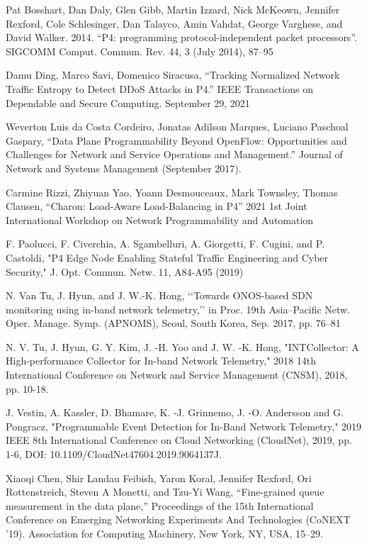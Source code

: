 \documentclass[conference]{IEEEtran}
\begin{document}
\begin{thebibliography}{00}
 Pat Bosshart, Dan Daly, Glen Gibb, Martin Izzard, Nick McKeown, Jennifer Rexford, Cole Schlesinger, Dan Talayco, Amin Vahdat, George Varghese, and David Walker. 2014. “P4: programming protocol-independent packet processors”. SIGCOMM Comput. Commun. Rev. 44, 3 (July 2014), 87–95

 Damu Ding, Marco Savi, Domenico Siracusa, “Tracking Normalized Network Traffic Entropy to Detect DDoS Attacks in P4.” IEEE Transactions on Dependable and Secure Computing. September 29, 2021

 Weverton Luis da Costa Cordeiro, Jonatas Adilson Marques, Luciano Paschoal Gaspary, “Data Plane Programmability Beyond OpenFlow: Opportunities and Challenges for Network and Service Operations and Management.” Journal of Network and Systems Management (September 2017).

 Carmine Rizzi, Zhiyuan Yao, Yoann Desmouceaux, Mark Townsley, Thomas Clausen, “Charon: Load-Aware Load-Balancing in P4” 2021 1st Joint International Workshop on Network Programmability and Automation

 F. Paolucci, F. Civerchia, A. Sgambelluri, A. Giorgetti, F. Cugini, and P. Castoldi, "P4 Edge Node Enabling Stateful Traffic Engineering and Cyber Security," J. Opt. Commun. Netw. 11, A84-A95 (2019)

 N. Van Tu, J. Hyun, and J. W.-K. Hong, ‘‘Towards ONOS-based SDN monitoring using in-band network telemetry,’’ in Proc. 19th Asia–Pacific Netw. Oper. Manage. Symp. (APNOMS), Seoul, South Korea, Sep. 2017, pp. 76–81

 N. V. Tu, J. Hyun, G. Y. Kim, J. -H. Yoo and J. W. -K. Hong, "INTCollector: A High-performance Collector for In-band Network Telemetry," 2018 14th International Conference on Network and Service Management (CNSM), 2018, pp. 10-18.

 J. Vestin, A. Kassler, D. Bhamare, K. -J. Grinnemo, J. -O. Andersson and G. Pongracz, "Programmable Event Detection for In-Band Network Telemetry," 2019 IEEE 8th International Conference on Cloud Networking (CloudNet), 2019, pp. 1-6, DOI: 10.1109/CloudNet47604.2019.9064137J. 

 Xiaoqi Chen, Shir Landau Feibish, Yaron Koral, Jennifer Rexford, Ori Rottenstreich, Steven A Monetti, and Tzu-Yi Wang, “Fine-grained queue measurement in the data plane,” Proceedings of the 15th International Conference on Emerging Networking Experiments And Technologies (CoNEXT '19). Association for Computing Machinery, New York, NY, USA, 15–29. 


\end{thebibliography}
\end{document}
